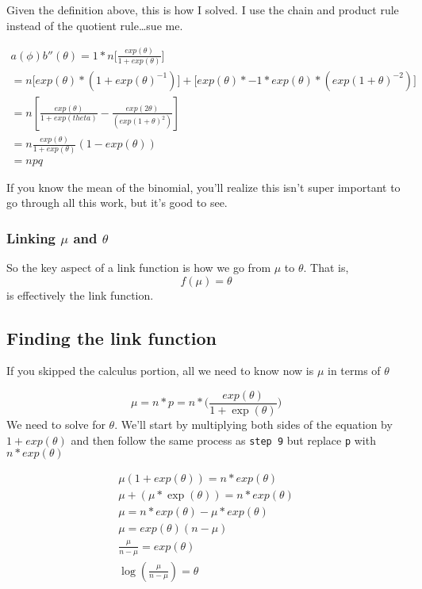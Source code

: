 \documentclass[
]{article}
\begin{document}
Given the definition above, this is how I solved. I use the chain and
product rule instead of the quotient rule\ldots sue me.

\begin{align}
a(\phi)b''(\theta) = 1*n\biggl[\frac{exp(\theta)}{1+exp(\theta)}\biggr] \\ 
= n\biggl[exp({\theta})*(1+exp(\theta)^{-1})\biggr] + \biggl[exp(\theta)*-1*exp(\theta)*
(exp(1+\theta)^{-2})\biggr] \\
=n[\frac{exp(\theta)}{{1+exp(theta)}} - \frac{exp(2\theta)}{(exp(1+\theta)^{2})}] \\
=n\frac{exp(\theta)}{1+exp(\theta)}(1-exp(\theta)) \\
=npq
\end{align}

If you know the mean of the binomial, you'll realize this isn't super
important to go through all this work, but it's good to see.

\hypertarget{linking-mu-and-theta}{%
\subsubsection{\texorpdfstring{Linking \(\mu\) and
\(\theta\)}{Linking \textbackslash mu and \textbackslash theta}}\label{linking-mu-and-theta}}

So the key aspect of a link function is how we go from \(\mu\) to
\(\theta\). That is, \[ f(\mu) = \theta\] is effectively the link
function.

\hypertarget{finding-the-link-function}{%
\subsection{Finding the link function}\label{finding-the-link-function}}

If you skipped the calculus portion, all we need to know now is \(\mu\)
in terms of \(\theta\)

\[\mu = n*p = n*\biggr(\frac{exp(\theta)}{1+\exp(\theta)}\biggr)\] We
need to solve for \(\theta\). We'll start by multiplying both sides of
the equation by \(1+exp(\theta)\) and then follow the same process as
\texttt{step\ 9} but replace \texttt{p} with \(n*exp(\theta)\)

\begin{align}
\mu(1+exp(\theta)) = n*exp(\theta) \\
\mu+(\mu*\exp(\theta)) = n*exp(\theta) \\
\mu = n*exp(\theta) - \mu*exp(\theta) \\
\mu = exp(\theta)(n-\mu) \\ 
\frac{\mu}{n-\mu}=exp(\theta) \\
\log(\frac{\mu}{n-\mu}) = \theta
\end{align}
\end{document}
